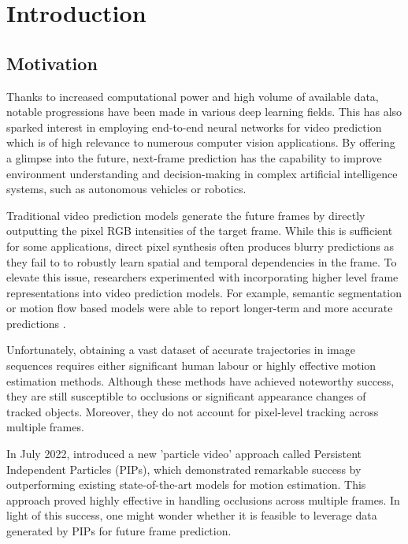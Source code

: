 \documentclass{l4proj}
\begin{document}
\chapter{Introduction}


\section{Motivation}
Thanks to increased computational power and high volume of available data, notable progressions have been made in various deep learning fields. This has also sparked interest in employing end-to-end neural networks for video prediction which is of high relevance to numerous computer vision applications. By offering a glimpse into the future, next-frame prediction has the capability to improve environment understanding and decision-making in complex artificial intelligence systems, such as autonomous vehicles or robotics.

Traditional video prediction models generate the future frames by directly outputting the pixel RGB intensities of the target frame. While this is sufficient for some applications, direct pixel synthesis often produces blurry predictions as they fail to to robustly learn spatial and temporal dependencies in the frame. To elevate this issue, researchers experimented with incorporating higher level frame representations into video prediction models. For example, semantic segmentation or motion flow based models were able to report longer-term and more accurate predictions \citep{DBLP:journals/pami/OpreaMGCORA22}.

Unfortunately, obtaining a vast dataset of accurate trajectories in image sequences requires either  significant human labour or highly effective motion estimation methods. Although these methods have achieved noteworthy success, they are still susceptible to occlusions or significant appearance changes of tracked objects. Moreover, they do not account for pixel-level tracking across multiple frames.

In July 2022, \citeauthor{DBLP:journals/corr/abs-2204-04153} introduced a new 'particle video' approach called Persistent Independent Particles (PIPs), which demonstrated remarkable success by outperforming existing state-of-the-art models for motion estimation. This approach proved highly effective in handling occlusions across multiple frames. In light of this success, one might wonder whether it is feasible to leverage data generated by PIPs for future frame prediction.
\end{document}
